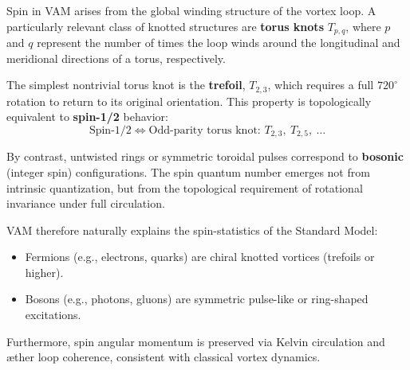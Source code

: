 Spin in VAM arises from the global winding structure of the vortex loop. A particularly relevant class of knotted structures are \textbf{torus knots} \( T_{p,q} \), where \( p \) and \( q \) represent the number of times the loop winds around the longitudinal and meridional directions of a torus, respectively.

The simplest nontrivial torus knot is the \textbf{trefoil}, \( T_{2,3} \), which requires a full \( 720^\circ \) rotation to return to its original orientation. This property is topologically equivalent to \textbf{spin-1/2} behavior:
\[
\text{Spin-1/2} \Longleftrightarrow \text{Odd-parity torus knot: } T_{2,3},\ T_{2,5},\ \ldots
\]

By contrast, untwisted rings or symmetric toroidal pulses correspond to \textbf{bosonic} (integer spin) configurations. The spin quantum number emerges not from intrinsic quantization, but from the topological requirement of rotational invariance under full circulation.

VAM therefore naturally explains the spin-statistics of the Standard Model:
\begin{itemize}
    \item Fermions (e.g., electrons, quarks) are chiral knotted vortices (trefoils or higher).
    \item Bosons (e.g., photons, gluons) are symmetric pulse-like or ring-shaped excitations.
\end{itemize}

Furthermore, spin angular momentum is preserved via Kelvin circulation and \ae ther loop coherence, consistent with classical vortex dynamics.
